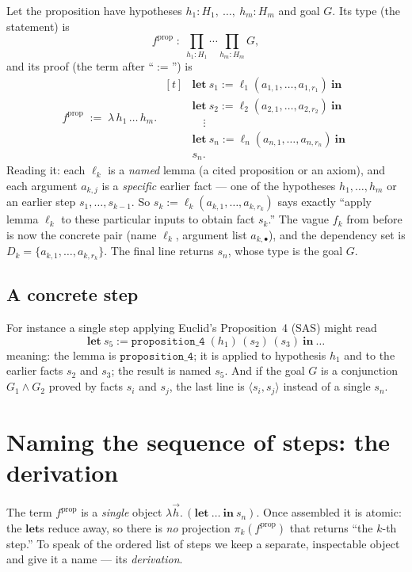 \documentclass{article}
\providecommand{\coloneqq}{\mathrel{:=}}
\begin{document}
Let the proposition have hypotheses $h_1 : H_1,\ \dots,\ h_m : H_m$ and goal $G$.
Its type (the statement) is
\[
  f^{\mathrm{prop}} \;:\; \prod_{h_1 : H_1} \cdots \prod_{h_m : H_m} G ,
\]
and its proof (the term after ``$\coloneqq$'') is
\[
  f^{\mathrm{prop}} \;\coloneqq\;
  \lambda\, h_1\, \dots\, h_m.\;
  \begin{aligned}[t]
    &\mathbf{let}\ s_1 \coloneqq \ell_1(a_{1,1}, \dots, a_{1,r_1})\ \mathbf{in}\\
    &\mathbf{let}\ s_2 \coloneqq \ell_2(a_{2,1}, \dots, a_{2,r_2})\ \mathbf{in}\\
    &\quad\vdots\\
    &\mathbf{let}\ s_n \coloneqq \ell_n(a_{n,1}, \dots, a_{n,r_n})\ \mathbf{in}\\
    &s_n .
  \end{aligned}
\]
Reading it: each $\ell_k$ is a \emph{named} lemma (a cited proposition or an
axiom), and each argument $a_{k,j}$ is a \emph{specific} earlier fact --- one of
the hypotheses $h_1, \dots, h_m$ or an earlier step $s_1, \dots, s_{k-1}$. So
$s_k \coloneqq \ell_k(a_{k,1}, \dots, a_{k,r_k})$ says exactly ``apply lemma
$\ell_k$ to these particular inputs to obtain fact $s_k$.'' The vague $f_k$ from
before is now the concrete pair (name $\ell_k$, argument list $a_{k,\bullet}$),
and the dependency set is $D_k = \{ a_{k,1}, \dots, a_{k,r_k} \}$. The final line
returns $s_n$, whose type is the goal $G$.

\subsection*{A concrete step}

For instance a single step applying Euclid's Proposition~4 (SAS) might read
\[
  \mathbf{let}\ s_5 \coloneqq \mathtt{proposition\_4}\;(h_1)\,(s_2)\,(s_3)\ \mathbf{in}\ \dots
\]
meaning: the lemma is $\mathtt{proposition\_4}$; it is applied to hypothesis
$h_1$ and to the earlier facts $s_2$ and $s_3$; the result is named $s_5$. And
if the goal $G$ is a conjunction $G_1 \wedge G_2$ proved by facts $s_i$ and
$s_j$, the last line is $\langle s_i, s_j \rangle$ instead of a single $s_n$.

\section*{Naming the sequence of steps: the derivation}

The term $f^{\mathrm{prop}}$ is a \emph{single} object $\lambda \vec h.\,
(\mathbf{let}\ \dots\ \mathbf{in}\ s_n)$. Once assembled it is atomic: the
$\mathbf{let}$s reduce away, so there is \emph{no} projection $\pi_k(f^{\mathrm{prop}})$
that returns ``the $k$-th step.'' To speak of the ordered list of steps we keep a
separate, inspectable object and give it a name --- its \emph{derivation}.
\end{document}
